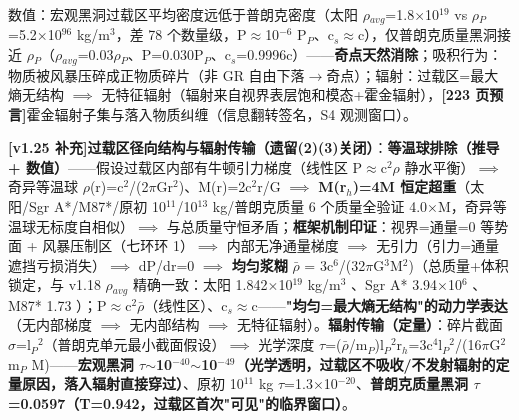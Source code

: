 \documentclass[UTF8,fontset=windows]{csoarticle}
\newcommand{\mtag}[1]{\textbf{[#1]}}
\newcommand{\up}[1]{\ensuremath{^{#1}}}
\newcommand{\down}[1]{\ensuremath{_{#1}}}
\begin{document}
数值：宏观黑洞过载区平均密度远低于普朗克密度（太阳 \ensuremath{\rho}\down{avg}=1.8\ensuremath{\times}10\up{19} vs \ensuremath{\rho}\down{P}=5.2\ensuremath{\times}10\up{96} kg/m\up{3}，差 78 个数量级，P\ensuremath{\approx}10\up{-6} P\down{P}、c\down{s}\ensuremath{\approx}c），仅普朗克质量黑洞接近 \ensuremath{\rho}\down{P}（\ensuremath{\rho}\down{avg}=0.03\ensuremath{\rho}\down{P}、P=0.030P\down{P}、c\down{s}=0.9996c）------\textbf{奇点天然消除}；吸积行为：物质被风暴压碎成正物质碎片（非 GR 自由下落\ensuremath{\to}奇点）；辐射：过载区=最大熵无结构 \ensuremath{\implies} 无特征辐射（辐射来自视界表层饱和模态+霍金辐射），\mtag{223 页预言}霍金辐射子集与落入物质纠缠（信息翻转签名，S4 观测窗口）。

\textbf{\mtag{v1.25 补充}过载区径向结构与辐射传输（遗留(2)(3)关闭）}：\textbf{等温球排除（推导 + 数值）}------假设过载区内部有牛顿引力梯度（线性区 P\ensuremath{\approx}c\up{2}\ensuremath{\rho} 静水平衡）\ensuremath{\implies} 奇异等温球 \ensuremath{\rho}(r)=c\up{2}/(2\ensuremath{\pi}Gr\up{2})、M(r)=2c\up{2}r/G \ensuremath{\implies} \textbf{M(r\down{h})=4M 恒定超重}（太阳/Sgr A*/M87*/原初 10\up{11}/10\up{13} kg/普朗克质量 6 个质量全验证 4.0\ensuremath{\times}M，奇异等温球无标度自相似）\ensuremath{\implies} 与总质量守恒矛盾；\textbf{框架机制印证}：视界=通量=0 等势面 + 风暴压制区（七环环 1）\ensuremath{\implies} 内部无净通量梯度 \ensuremath{\implies} 无引力（引力=通量遮挡亏损消失）\ensuremath{\implies} dP/dr=0 \ensuremath{\implies} \textbf{均匀浆糊} \ensuremath{\bar{\rho}} = 3c\up{6}/(32\ensuremath{\pi}G\up{3}M\up{2})（总质量+体积锁定，与 v1.18 \ensuremath{\rho}\down{avg} 精确一致：太阳 1.842\ensuremath{\times}10\up{19} kg/m\up{3} \checkmark、Sgr A* 3.94\ensuremath{\times}10\up{6} \checkmark、M87* 1.73 \checkmark）；P\ensuremath{\approx}c\up{2}\ensuremath{\bar{\rho}}（线性区）、c\down{s}\ensuremath{\approx}c------\textbf{"均匀=最大熵无结构"的动力学表达}（无内部梯度 \ensuremath{\implies} 无内部结构 \ensuremath{\implies} 无特征辐射）。\textbf{辐射传输（定量）}：碎片截面 \ensuremath{\sigma}=l\down{P}\up{2}（普朗克单元最小截面假设）\ensuremath{\implies} 光学深度 \ensuremath{\tau}=(\ensuremath{\bar{\rho}}/m\down{P})l\down{P}\up{2}r\down{h}=3c\up{4}l\down{P}\up{2}/(16\ensuremath{\pi}G\up{2}m\down{P} M)------\textbf{宏观黑洞 \ensuremath{\tau}\ensuremath{\sim}10\up{-40}\ensuremath{\sim}10\up{-49}（光学透明，过载区不吸收/不发射辐射的定量原因，落入辐射直接穿过）}、原初 10\up{11} kg \ensuremath{\tau}=1.3\ensuremath{\times}10\up{-20}、\textbf{普朗克质量黑洞 \ensuremath{\tau}=0.0597（T=0.942，过载区首次"可见"的临界窗口）}。
\end{document}
